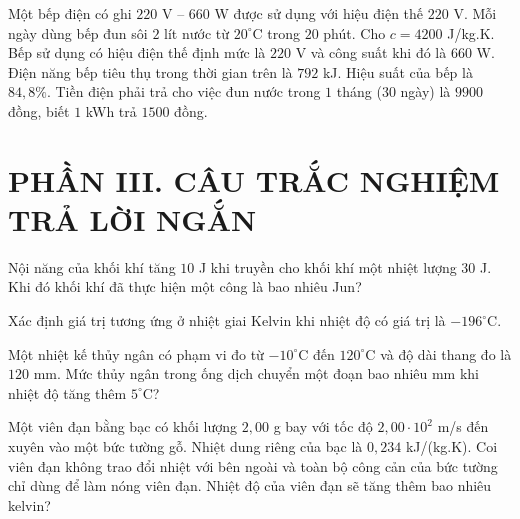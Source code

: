 \begin{ex}
Một bếp điện có ghi $220$ V -- $660$ W được sử dụng với hiệu điện thế $220$ V. Mỗi ngày dùng bếp đun sôi $2$ lít nước từ $20^\circ\mathrm{C}$ trong $20$ phút. Cho $c=4200$ J/kg.K.
\choiceTF
{\True Bếp sử dụng có hiệu điện thế định mức là $220$ V và công suất khi đó là $660$ W.}
{\True Điện năng bếp tiêu thụ trong thời gian trên là $792$ kJ.}
{\True Hiệu suất của bếp là $84,8\%$.}
{\True Tiền điện phải trả cho việc đun nước trong $1$ tháng (30 ngày) là $9900$ đồng, biết $1$ kWh trả $1500$ đồng.}
\end{ex}

\section*{PHẦN III. CÂU TRẮC NGHIỆM TRẢ LỜI NGẮN}

\begin{ex}
Nội năng của khối khí tăng $10$ J khi truyền cho khối khí một nhiệt lượng $30$ J. Khi đó khối khí đã thực hiện một công là bao nhiêu Jun?
\end{ex}

\begin{ex}
Xác định giá trị tương ứng ở nhiệt giai Kelvin khi nhiệt độ có giá trị là $-196^\circ\mathrm{C}$.
\loigiai{\[T=t+273=-196+273=77\ \mathrm{K}.\]}
\end{ex}

\begin{ex}
Một nhiệt kế thủy ngân có phạm vi đo từ $-10^\circ\mathrm{C}$ đến $120^\circ\mathrm{C}$ và độ dài thang đo là $120$ mm. Mức thủy ngân trong ống dịch chuyển một đoạn bao nhiêu mm khi nhiệt độ tăng thêm $5^\circ\mathrm{C}$?
\loigiai{\[\Delta T=120-(-10)=130^\circ\mathrm{C}.\]
\[\Delta l=\frac{120}{130}\cdot5\approx4,6\ \mathrm{mm}.\]}
\end{ex}

\begin{ex}
Một viên đạn bằng bạc có khối lượng $2,00$ g bay với tốc độ $2,00\cdot10^2$ m/s đến xuyên vào một bức tường gỗ. Nhiệt dung riêng của bạc là $0,234$ kJ/(kg.K). Coi viên đạn không trao đổi nhiệt với bên ngoài và toàn bộ công cản của bức tường chỉ dùng để làm nóng viên đạn. Nhiệt độ của viên đạn sẽ tăng thêm bao nhiêu kelvin?
\loigiai{\[m=0,002\ \mathrm{kg},\qquad c=234\ \mathrm{J/(kg.K)}.\]
\[Q=\frac12mv^2=\frac12\cdot0,002\cdot(200)^2=40\ \mathrm{J}.\]
\[\Delta T=\frac{Q}{mc}=\frac{40}{0,002\cdot234}\approx85,5\ \mathrm{K}.\]}
\end{ex}

